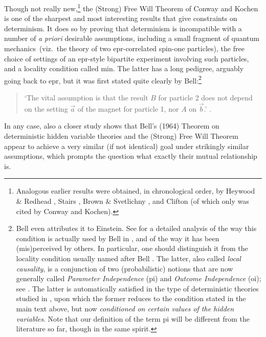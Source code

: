 \documentclass[11pt]{article}
\newcommand{\epr}{{\sc epr}}
\newcommand{\qm}{quantum mechanics}
\begin{document}
Though not really new,\footnote{Analogous earlier results were obtained, in chronological order, by Heywood \& Redhead \cite{HR}, Stairs \cite{Stairs}, Brown \& Svetlichny \cite{BS}, and Clifton \cite{Clifton} (of which only \cite{HR} was cited by Conway and Kochen).}  the (Strong) Free Will Theorem of Conway and Kochen  \cite{CK1,CK2} is one of the sharpest and most interesting results that give constraints on determinism. It does so by  proving that determinism is incompatible with a number of \emph{a priori} desirable assumptions, including a small fragment of \qm\ (viz.\ the theory of two \epr-correlated spin-one particles), the free choice of settings of an \epr-style bipartite experiment involving such particles, and a  locality 
condition called {\sc min}. The latter has a long pedigree, arguably going back to {\sc epr}, but it was first stated quite clearly by Bell:\footnote{Bell \cite{Bell1} even attributes it to Einstein.
See \cite{Wiseman} for a detailed  analysis of the way this condition is actually used by Bell in \cite{Bell1,Bell3},
and of the way it has been (mis)perceived by others. In particular, one should distinguish it
from the locality condition usually named after Bell \cite{Bell4}. The latter, also called \emph{local causality},  is a conjunction of  two (probabilistic) notions  that are now generally called \emph{Parameter Independence}  ({\sc pi})
and \emph{Outcome Independence} ({\sc oi}); see  \cite{Bub,Jaeger,Jarrett,Maudlin,Seevinck,Shimony}.
The latter is automatically satisfied in the type of  deterministic  theories studied in \cite{Bell1,CK1,CK2}, upon which the former reduces to the condition  stated in the main text above, but now \emph{conditioned on certain values of the hidden variables}. Note that our  definition of the term {\sc pi} will  be different from the literature so far, though in the same spirit.} 
\begin{quotation}
`The vital assumption is that the result $B$ for particle 2 does not depend on the setting $\vec{a}$ of the magnet for particle 1, nor $A$ on $\vec{b}$.' \cite[p.\ 196]{Bell1}.
\end{quotation} 
In any case, also a closer study shows that Bell's (1964) Theorem on deterministic hidden variable theories  and the (Strong) Free Will Theorem appear to achieve a very similar (if not identical)  goal under strikingly similar assumptions, which prompts the question what exactly their mutual relationship is. 
\end{document}
